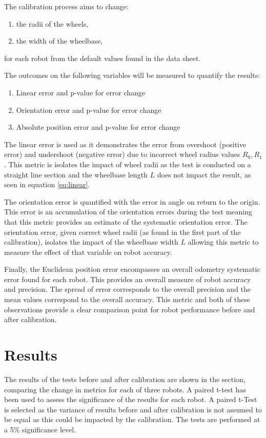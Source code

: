 \documentclass[conference]{IEEEtran}
\begin{document}
The calibration process aims to change:
\begin{enumerate}
    \item the radii of the wheels,
    \item the width of the wheelbase,
\end{enumerate}
for each robot from the default values found in the data sheet.

The outcomes on the following variables will be measured to quantify the results:
\begin{enumerate}
    \item Linear error and p-value for error change
    \item Orientation error and p-value for error change
    \item Absolute position error and p-value for error change
\end{enumerate}

The linear error is used as it demonstrates the error from overshoot (positive error) and undershoot (negative error) due to incorrect wheel radius values $R_0, R_1$. This metric is isolates the impact of wheel radii as the test is conducted on a straight line section and the wheelbase length $L$ does not impact the result, as seen in equation \ref{eq:linear}.

The orientation error is quantified with the error in angle on return to the origin. This error is an accumulation of the orientation errors during the test meaning that this metric provides an estimate of the systematic orientation error.
The orientation error, given correct wheel radii (as found in the first part of the calibration), isolates the impact of the wheelbase width $L$ allowing this metric to measure the effect of that variable on robot accuracy.

Finally, the Euclidean position error encompasses an overall odometry systematic error found for each robot. This provides an overall measure of robot accuracy and precision. The spread of error corresponds to the overall precision and the mean values correspond to the overall accuracy. 
This metric and both of these observations provide a clear comparison point for robot performance before and after calibration.


\section{Results}\label{sec:results}


The results of the tests before and after calibration are shown in the section, comparing the change in metrics for each of three robots. 
A paired t-test has been used to assess the significance of the results for each robot. A paired t-Test is selected as the variance of results before and after calibration is not assumed to be equal as this could be impacted by the calibration. The tests are performed at a 5\% significance level.
\end{document}
